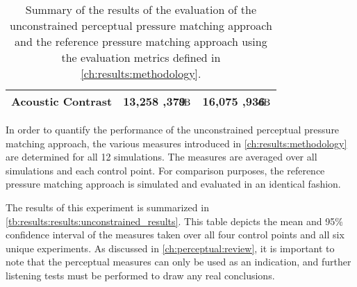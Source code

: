 \begin{table}[]
\begin{tabular}{lS[round-mode=places]S[round-mode=places]}
    Acoustic Contrast   & 13,258 ,379 $\mathrm{\hspace{-12pt}dB}$  & 16,075  ,936 $\mathrm{\hspace{-12pt}dB}$  \\ 
    \bottomrule
\end{tabular}
    \caption{Summary of the results of the evaluation of the unconstrained perceptual pressure matching approach 
        and the reference pressure matching approach using the evaluation metrics defined in 
        \autoref{ch:results:methodology}.}
    \label{tb:results:results:unconstrained_results}
\end{table}
In order to quantify the performance of the unconstrained perceptual pressure matching approach, the various 
measures introduced in \autoref{ch:results:methodology} are determined for all 12 simulations.
The measures are averaged over all simulations and each control point.
For comparison purposes, the reference pressure matching approach is simulated and evaluated in an identical fashion.

The results of this experiment is summarized in \autoref{tb:results:results:unconstrained_results}.
This table depicts the mean and 95\% confidence interval of the measures taken over all four control points and all six unique experiments.
As discussed in \autoref{ch:perceptual:review}, it is important to note that the perceptual measures can only
be used as an indication, and further listening tests must be performed to draw any real conclusions.


